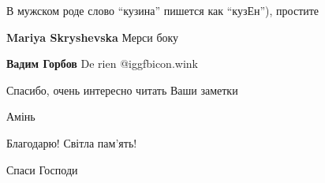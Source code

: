\begin{itemize}
В мужском роде слово \enquote{кузина} пишется как \enquote{кузЕн}), простите

\begin{itemize} %
\textbf{Mariya Skryshevska} Мерси боку

\textbf{Вадим Горбов} De rien @igg{fbicon.wink} 
\end{itemize} %

Спасибо, очень интересно читать Ваши заметки

Амінь

Благодарю! Світла пам'ять!

Спаси Господи



\end{itemize} %
